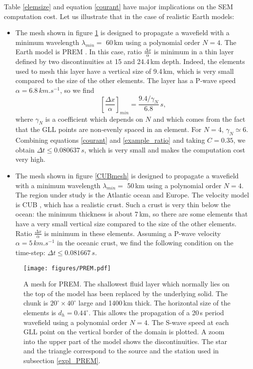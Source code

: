 Table \eqref{elemsize} and equation \eqref{courant} have major implications on the SEM computation cost. Let us illustrate that in the case of realistic Earth models:
\begin{itemize}[topsep=0pt]
\item The mesh shown in figure \ref{PREMmesh} is designed to propagate a wavefield with a minimum wavelength $\lambda_{min} =$ 60\,km using a polynomial order $N=4$. The Earth model is PREM . In this case, ratio $\frac{\Delta x}{\alpha}$ is minimum in a thin layer defined by two discontinuities at 15 and 24.4\,km depth. Indeed, the elements used to mesh this layer have a vertical size of 9.4\,km, which is very small compared to the size of the other elements. The layer has a P-wave speed $\alpha = 6.8\,km.s^{-1}$, so we find
\begin{equation}
\label{example_ratio}
\left[ \frac{\Delta x}{\alpha} \right]_{min} =
\frac{9.4/\gamma_N}{6.8} \, s \mbox{,}
\end{equation}
where $\gamma_N$ is a coefficient which depends on $N$ and which comes from the fact that the GLL points are non-evenly spaced in an element. For $N=4$, $\gamma_N \simeq 6$. Combining equations \eqref{courant} and \eqref{example_ratio} and taking $C=0.35$, we obtain $\Delta t \leq 0.080637\,s$, which is very small and makes the computation cost very high.
\item The mesh shown in figure \ref{CUBmesh} is designed to propagate a wavefield with a minimum wavelength $\lambda_{min} =$ 50\,km using a polynomial order $N=4$. The region under study is the Atlantic ocean and Europe. The velocity model is CUB , which has a realistic crust. Such a crust is very thin below the ocean: the minimum thickness is about 7\,km, so there are some elements that have a very small vertical size compared to the size of the other elements. Ratio $\frac{\Delta x}{\alpha}$ is minimum in these elements. Assuming a P-wave velocity $\alpha = 5\,km.s^{-1}$ in the oceanic crust, we find the following condition on the time-step: $\Delta t \leq 0.081667\,s$.
\end{itemize}

\begin{figure}
\centerline{\texttt{[image: figures/PREM.pdf]}}
\caption{A mesh for PREM. The shallowest fluid layer which normally lies on the top of the model has been replaced by the underlying solid. The chunk is $\mbox{20}^{\circ} \times \mbox{40}^{\circ}$ large and 1400\,km thick. The horizontal size of the elements is $d_h=\mbox{0.44}^{\circ}$. This allows the propagation of a 20\,s period wavefield using a polynomial order $N=4$. The S-wave speed at each GLL point on the vertical border of the domain is plotted. A zoom into the upper part of the model shows the discontinuities. The star and the triangle correspond to the source and the station used in subsection \ref{expl_PREM}.}
\label{PREMmesh}
\end{figure}

